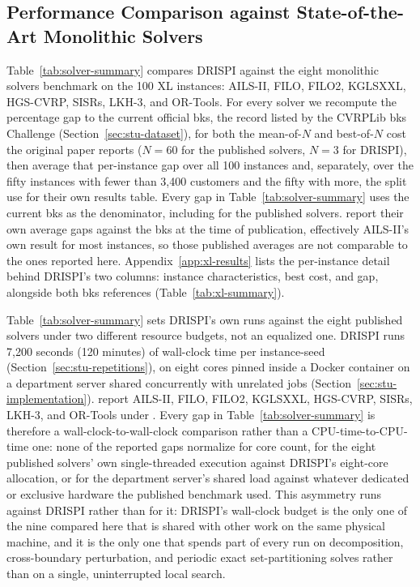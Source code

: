 \subsection{Performance Comparison against State-of-the-Art Monolithic Solvers}\label{sec:stu-comparison}
Table~\ref{tab:solver-summary} compares DRISPI against the eight monolithic solvers \citet{queirogaXLInstancesCapacitated2026} benchmark on the 100 XL instances: AILS-II, FILO, FILO2, KGLSXXL, HGS-CVRP, SISRs, LKH-3, and OR-Tools. For every solver we recompute the percentage gap to the current official \gls{bks}, the record listed by the CVRPLib \gls{bks} Challenge (Section~\ref{sec:stu-dataset}), for both the mean-of-$N$ and best-of-$N$ cost the original paper reports ($N=60$ for the published solvers, $N=3$ for DRISPI), then average that per-instance gap over all 100 instances and, separately, over the fifty instances with fewer than 3,400 customers and the fifty with more, the split \citet{queirogaXLInstancesCapacitated2026} use for their own results table. Every gap in Table~\ref{tab:solver-summary} uses the current \gls{bks} as the denominator, including for the published solvers. \citet{queirogaXLInstancesCapacitated2026} report their own average gaps against the \gls{bks} at the time of publication, effectively AILS-II's own result for most instances, so those published averages are not comparable to the ones reported here. Appendix~\ref{app:xl-results} lists the per-instance detail behind DRISPI's two columns: instance characteristics, best cost, and gap, alongside both \gls{bks} references (Table~\ref{tab:xl-summary}).

Table~\ref{tab:solver-summary} sets DRISPI's own runs against the eight published solvers under two different resource budgets, not an equalized one. DRISPI runs 7{,}200 seconds (120 minutes) of wall-clock time per instance-seed (Section~\ref{sec:stu-repetitions}), on eight cores pinned inside a Docker container on a department server shared concurrently with unrelated jobs (Section~\ref{sec:stu-implementation}). \citet{queirogaXLInstancesCapacitated2026} report AILS-II, FILO, FILO2, KGLSXXL, HGS-CVRP, SISRs, LKH-3, and OR-Tools under . Every gap in Table~\ref{tab:solver-summary} is therefore a wall-clock-to-wall-clock comparison rather than a CPU-time-to-CPU-time one: none of the reported gaps normalize for core count, for the eight published solvers' own single-threaded execution against DRISPI's eight-core allocation, or for the department server's shared load against whatever dedicated or exclusive hardware the published benchmark used. This asymmetry runs against DRISPI rather than for it: DRISPI's wall-clock budget is the only one of the nine compared here that is shared with other work on the same physical machine, and it is the only one that spends part of every run on decomposition, cross-boundary perturbation, and periodic exact set-partitioning solves rather than on a single, uninterrupted local search.

